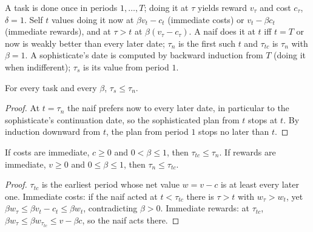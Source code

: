\begin{definition}
\label{def:beh-task}
\leanok
A task is done once in periods $1,\dots,T$; doing it at $\tau$ yields reward $v_\tau$ and cost $c_\tau$, $\delta=1$.
Self $t$ values doing it now at $\beta v_t-c_t$ (immediate costs) or $v_t-\beta c_t$ (immediate rewards), and at
$\tau>t$ at $\beta(v_\tau-c_\tau)$. A naif does it at $t$ iff $t=T$ or now is weakly better than every later date;
$\tau_n$ is the first such $t$ and $\tau_{tc}$ is $\tau_n$ with $\beta=1$. A sophisticate's date is computed by
backward induction from $T$ (doing it when indifferent); $\tau_s$ is its value from period $1$.
\end{definition}

\begin{theorem}
\label{thm:beh-soph-le-naive}
\leanok
{}
For every task and every $\beta$, $\tau_s\le\tau_n$.
\end{theorem}
\begin{proof}
\leanok
At $t=\tau_n$ the naif prefers now to every later date, in particular to the sophisticate's continuation date,
so the sophisticated plan from $t$ stops at $t$. By induction downward from $t$, the plan from period $1$ stops
no later than $t$.
\end{proof}

\begin{theorem}
\label{thm:beh-naive-tc}
\leanok
{}
If costs are immediate, $c\ge0$ and $0<\beta\le1$, then $\tau_{tc}\le\tau_n$. If rewards are immediate, $v\ge0$ and
$0\le\beta\le1$, then $\tau_n\le\tau_{tc}$.
\end{theorem}
\begin{proof}
\leanok
$\tau_{tc}$ is the earliest period whose net value $w=v-c$ is at least every later one. Immediate costs: if the
naif acted at $t<\tau_{tc}$ there is $\tau>t$ with $w_\tau>w_t$, yet $\beta w_\tau\le\beta v_t-c_t\le\beta w_t$,
contradicting $\beta>0$. Immediate rewards: at $\tau_{tc}$, $\beta w_\tau\le\beta w_{\tau_{tc}}\le v-\beta c$, so
the naif acts there.
\end{proof}

